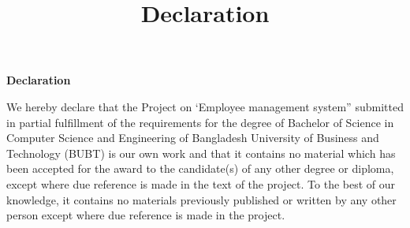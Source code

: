 \title{Declaration}
\begin{center}
    \large \textbf{Declaration}
\end{center}
\vspace{5.5mm}
We hereby declare that the Project on ‘Employee management system” submitted in partial fulfillment of the requirements for the degree of Bachelor of Science in Computer Science and Engineering of Bangladesh University of Business and Technology (BUBT) is our own work and that it contains no material which has been accepted for the award to the candidate(s) of any other degree or diploma, except where due reference is made in the text of the project. To the best of our knowledge, it contains no materials previously published or written by any other person except where due reference is made in the project.